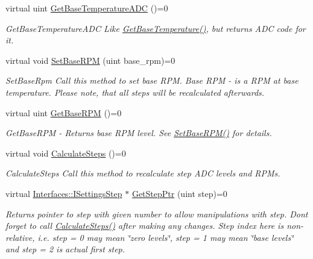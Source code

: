 \begin{DoxyCompactItemize}
virtual uint \hyperlink{class_interfaces_1_1_i_settings_generator_a1000ff41c6eecdb55a46c859ca0ebe67}{Get\+Base\+Temperature\+A\+DC} ()=0
\begin{DoxyCompactList}\small\item\em Get\+Base\+Temperature\+A\+DC Like \hyperlink{class_interfaces_1_1_i_settings_generator_a9cc36185b446f21e09a0e5633f39a1c5}{Get\+Base\+Temperature()}, but returns A\+DC code for it. \end{DoxyCompactList}\item 
virtual void \hyperlink{class_interfaces_1_1_i_settings_generator_a4caf07447d0930440d9f21318892244c}{Set\+Base\+R\+PM} (uint base\+\_\+rpm)=0
\begin{DoxyCompactList}\small\item\em Set\+Base\+Rpm Call this method to set base R\+PM. Base R\+PM -\/ is a R\+PM at base temperature. Please note, that all steps will be recalculated afterwards. \end{DoxyCompactList}\item 
virtual uint \hyperlink{class_interfaces_1_1_i_settings_generator_ad088253da57b2ee0b94fe6fd1fb2dfdd}{Get\+Base\+R\+PM} ()=0
\begin{DoxyCompactList}\small\item\em Get\+Base\+R\+PM -\/ Returns base R\+PM level. See \hyperlink{class_interfaces_1_1_i_settings_generator_a4caf07447d0930440d9f21318892244c}{Set\+Base\+R\+P\+M()} for details. \end{DoxyCompactList}\item 
\mbox{\label{class_interfaces_1_1_i_settings_generator_a7788522bb5d25bfd8b8af430512ec5f5}} 
virtual void \hyperlink{class_interfaces_1_1_i_settings_generator_a7788522bb5d25bfd8b8af430512ec5f5}{Calculate\+Steps} ()=0
\begin{DoxyCompactList}\small\item\em Calculate\+Steps Call this method to recalculate step A\+DC levels and R\+P\+Ms. \end{DoxyCompactList}\item 
virtual \hyperlink{class_interfaces_1_1_i_settings_step}{Interfaces\+::\+I\+Settings\+Step} $\ast$ \hyperlink{class_interfaces_1_1_i_settings_generator_af1b65a18c3ade3235715ae2e9cdbcfe0}{Get\+Step\+Ptr} (uint step)=0
\begin{DoxyCompactList}\small\item\em Returns pointer to step with given number to allow manipulations with step. Don\textquotesingle{}t forget to call \hyperlink{class_interfaces_1_1_i_settings_generator_a7788522bb5d25bfd8b8af430512ec5f5}{Calculate\+Steps()} after making any changes. Step index here is non-\/relative, i.\+e. step = 0 may mean \char`\"{}zero levels\char`\"{}, step = 1 may mean \char`\"{}base levels\char`\"{} and step = 2 is actual first step. \end{DoxyCompactList}\item 

\end{DoxyCompactItemize}
